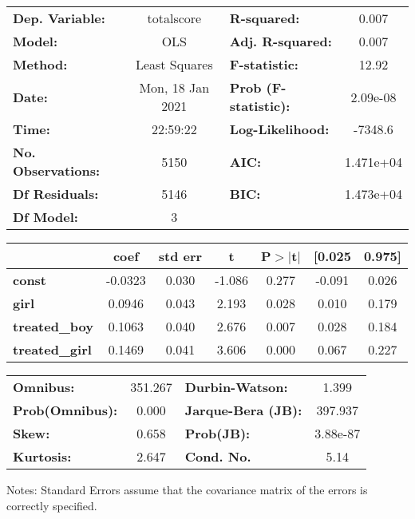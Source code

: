 \begin{center}
\begin{tabular}{lclc}
\toprule
\textbf{Dep. Variable:}    &    totalscore    & \textbf{  R-squared:         } &     0.007   \\
\textbf{Model:}            &       OLS        & \textbf{  Adj. R-squared:    } &     0.007   \\
\textbf{Method:}           &  Least Squares   & \textbf{  F-statistic:       } &     12.92   \\
\textbf{Date:}             & Mon, 18 Jan 2021 & \textbf{  Prob (F-statistic):} &  2.09e-08   \\
\textbf{Time:}             &     22:59:22     & \textbf{  Log-Likelihood:    } &   -7348.6   \\
\textbf{No. Observations:} &        5150      & \textbf{  AIC:               } & 1.471e+04   \\
\textbf{Df Residuals:}     &        5146      & \textbf{  BIC:               } & 1.473e+04   \\
\textbf{Df Model:}         &           3      & \textbf{                     } &             \\
\bottomrule
\end{tabular}
\begin{tabular}{lcccccc}
                       & \textbf{coef} & \textbf{std err} & \textbf{t} & \textbf{P$> |$t$|$} & \textbf{[0.025} & \textbf{0.975]}  \\
\midrule
\textbf{const}         &      -0.0323  &        0.030     &    -1.086  &         0.277        &       -0.091    &        0.026     \\
\textbf{girl}          &       0.0946  &        0.043     &     2.193  &         0.028        &        0.010    &        0.179     \\
\textbf{treated\_boy}  &       0.1063  &        0.040     &     2.676  &         0.007        &        0.028    &        0.184     \\
\textbf{treated\_girl} &       0.1469  &        0.041     &     3.606  &         0.000        &        0.067    &        0.227     \\
\bottomrule
\end{tabular}
\begin{tabular}{lclc}
\textbf{Omnibus:}       & 351.267 & \textbf{  Durbin-Watson:     } &    1.399  \\
\textbf{Prob(Omnibus):} &   0.000 & \textbf{  Jarque-Bera (JB):  } &  397.937  \\
\textbf{Skew:}          &   0.658 & \textbf{  Prob(JB):          } & 3.88e-87  \\
\textbf{Kurtosis:}      &   2.647 & \textbf{  Cond. No.          } &     5.14  \\
\bottomrule
\end{tabular}
\end{center}

Notes: \newline
 [1] Standard Errors assume that the covariance matrix of the errors is correctly specified.
